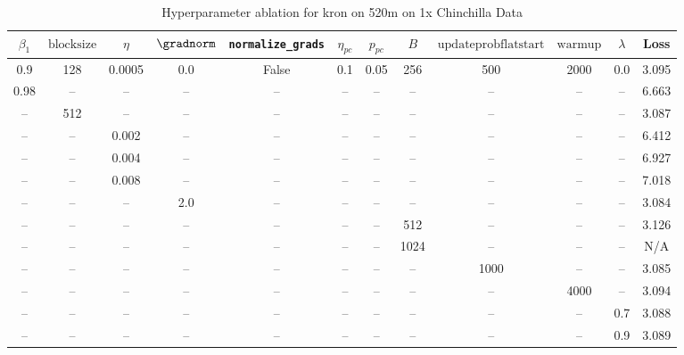 \begin{table}[h!]
\centering
\caption{Hyperparameter ablation for kron on 520m on 1x Chinchilla Data}
\label{tab:ablation_kron_520m_on_1x_chinchilla_data}
\begin{tabular}{cccccccccccc}
\toprule
$\beta_1$ & $\mathrm{block size}$ & $\eta$ & $\gradnorm$ & \texttt{normalize\_grads} & $\eta_{pc}$ & $p_{pc}$ & $B$ & $\mathrm{update prob flat start}$ & $\mathrm{warmup}$ & $\lambda$ & Loss \\
\midrule
0.9 & 128 & 0.0005 & 0.0 & False & 0.1 & 0.05 & 256 & 500 & 2000 & 0.0 & 3.095 \\
\midrule
0.98 & -- & -- & -- & -- & -- & -- & -- & -- & -- & -- & 6.663 \\
-- & 512 & -- & -- & -- & -- & -- & -- & -- & -- & -- & 3.087 \\
-- & -- & 0.002 & -- & -- & -- & -- & -- & -- & -- & -- & 6.412 \\
-- & -- & 0.004 & -- & -- & -- & -- & -- & -- & -- & -- & 6.927 \\
-- & -- & 0.008 & -- & -- & -- & -- & -- & -- & -- & -- & 7.018 \\
-- & -- & -- & 2.0 & -- & -- & -- & -- & -- & -- & -- & 3.084 \\
-- & -- & -- & -- & -- & -- & -- & 512 & -- & -- & -- & 3.126 \\
-- & -- & -- & -- & -- & -- & -- & 1024 & -- & -- & -- & N/A \\
-- & -- & -- & -- & -- & -- & -- & -- & 1000 & -- & -- & 3.085 \\
-- & -- & -- & -- & -- & -- & -- & -- & -- & 4000 & -- & 3.094 \\
-- & -- & -- & -- & -- & -- & -- & -- & -- & -- & 0.7 & 3.088 \\
-- & -- & -- & -- & -- & -- & -- & -- & -- & -- & 0.9 & 3.089 \\
\bottomrule
\end{tabular}
\end{table}

